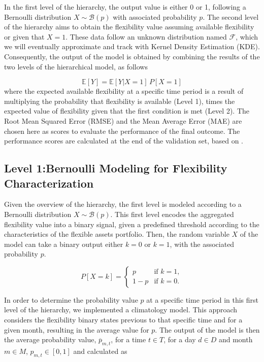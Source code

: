 In the first level of the hierarchy, the output value is either 0 or 1, following a Bernoulli distribution $X \sim \mathcal{B}(p)$ with associated probability $p$. The second level of the hierarchy aims to obtain the flexibility value assuming available flexibility or given that $X=1$. These data follow an unknown distribution named $\mathcal{F}$, which we will eventually approximate and track with Kernel Density Estimation (KDE). Consequently, the output of the model is obtained by combining the results of the two levels of the hierarchical model, as follows

\begin{equation} \label{eq:bernoulli}
  \mathbb{E}[Y] = \mathbb{E}[Y|X=1] \,  P[X=1]
\end{equation}
where the expected available flexibility at a specific time period is a result of multiplying the probability that flexibility is available (Level 1), times the expected value of flexibility given that the first condition is met (Level 2). The Root Mean Squared Error (RMSE) and the Mean Average Error (MAE) are chosen here as scores to evaluate the performance of the final outcome. The performance scores are calculated  at the end of the validation set, based on \cite{Hyndman2021}.

\subsection{Level 1:Bernoulli Modeling for Flexibility Characterization}\label{sect:Level1}
Given the overview of the hierarchy, the first level is modeled according to a Bernoulli distribution $X \sim \mathcal{B}(p)$. This first level encodes the aggregated flexibility value into a binary signal, given a predefined threshold according to the characteristics of the flexible assets portfolio. Then, the random variable $X$  of the model can take a binary output either $k=0$ or $k=1$, with the associated probability $p$.

\begin{equation}
  P[X = k] =
  \begin{cases} 
    p     & \text{if $k = 1$}, \\
    1 - p & \text{if $k = 0$}.
  \end{cases}
\end{equation}


In order to determine the probability value $p$ at a specific time period in this first level of the hierarchy, we implemented a climatology model. This approach considers the flexibility binary states previous to that specific time and for a given month, resulting in the average value for $p$. The output of the model is then the average probability value,  $\overline{p}_{m,t}$,  for a time $t \in T$, for a day $d \in D$ and month $m \in M$, $p_{m,t} \in [0,1]$ and calculated as 

